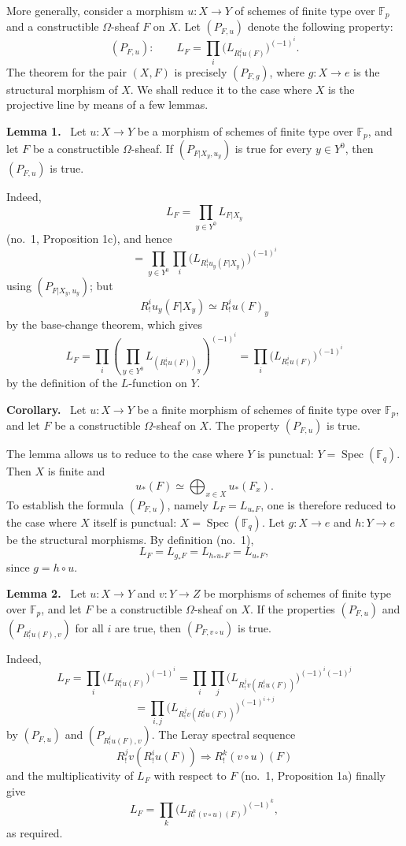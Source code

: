 \documentclass[11pt]{article}
\newenvironment{statement}[1]{\par\medskip\noindent\textbf{#1.}\ }{\par\medskip}
\DeclareMathOperator{\Spec}{Spec}
\providecommand{\Spec}{\operatorname{Spec}}
\providecommand{\Spec}{\operatorname{Spec}}
\providecommand{\Spec}{\operatorname{Spec}}
\providecommand{\Spec}{\operatorname{Spec}}
\begin{document}
More generally, consider a morphism $u:X\to Y$ of schemes of finite type over $\mathbb F_p$ and a constructible $\Omega$-sheaf $F$ on $X$. Let $(P_{F,u})$ denote the following property:
\[
(P_{F,u}):\qquad
L_F=\prod_i\bigl(L_{R^i_!u(F)}\bigr)^{(-1)^i}.
\]
The theorem for the pair $(X,F)$ is precisely $(P_{F,g})$, where $g:X\to e$ is the structural morphism of $X$. We shall reduce it to the case where $X$ is the projective line by means of a few lemmas.

\begin{statement}{Lemma 1}
Let $u:X\to Y$ be a morphism of schemes of finite type over $\mathbb F_p$, and let $F$ be a constructible $\Omega$-sheaf. If $(P_{F|X_y,u_y})$ is true for every $y\in Y^0$, then $(P_{F,u})$ is true.
\end{statement}

Indeed,
\[
L_F=\prod_{y\in Y^0}L_{F|X_y}
\]
(no.~1, Proposition 1c), and hence
\[
=\prod_{y\in Y^0}\prod_i\bigl(L_{R^i_!u_y(F|X_y)}\bigr)^{(-1)^i}
\]
using $(P_{F|X_y,u_y})$; but
\[
R^i_!u_y(F|X_y)\simeq R^i_!u(F)_y
\]
by the base-change theorem, which gives
\[
L_F=\prod_i\left(\prod_{y\in Y^0}L_{(R^i_!u(F))_y}\right)^{(-1)^i}
=\prod_i\bigl(L_{R^i_!u(F)}\bigr)^{(-1)^i}
\]
by the definition of the $L$-function on $Y$.

\begin{statement}{Corollary}
Let $u:X\to Y$ be a finite morphism of schemes of finite type over $\mathbb F_p$, and let $F$ be a constructible $\Omega$-sheaf on $X$. The property $(P_{F,u})$ is true.
\end{statement}

The lemma allows us to reduce to the case where $Y$ is punctual: $Y=\Spec(\mathbb F_q)$. Then $X$ is finite and
\[
u_*(F)\simeq \bigoplus_{x\in X}u_*(F_x).
\]
To establish the formula $(P_{F,u})$, namely $L_F=L_{u_*F}$, one is therefore reduced to the case where $X$ itself is punctual: $X=\Spec(\mathbb F_q)$. Let $g:X\to e$ and $h:Y\to e$ be the structural morphisms. By definition (no.~1),
\[
L_F=L_{g_*F}=L_{h_*u_*F}=L_{u_*F},
\]
since $g=h\circ u$.

\begin{statement}{Lemma 2}
Let $u:X\to Y$ and $v:Y\to Z$ be morphisms of schemes of finite type over $\mathbb F_p$, and let $F$ be a constructible $\Omega$-sheaf on $X$. If the properties $(P_{F,u})$ and $(P_{R^i_!u(F),v})$ for all $i$ are true, then $(P_{F,v\circ u})$ is true.
\end{statement}

Indeed,
\[
L_F=\prod_i\bigl(L_{R^i_!u(F)}\bigr)^{(-1)^i}
 =\prod_i\prod_j\bigl(L_{R^j_!v(R^i_!u(F))}\bigr)^{(-1)^i(-1)^j}
\]
\[
=\prod_{i,j}\bigl(L_{R^j_!v(R^i_!u(F))}\bigr)^{(-1)^{i+j}}
\]
by $(P_{F,u})$ and $(P_{R^i_!u(F),v})$. The Leray spectral sequence
\[
R^j_!v(R^i_!u(F))\Longrightarrow R^k_!(v\circ u)(F)
\]
and the multiplicativity of $L_F$ with respect to $F$ (no.~1, Proposition 1a) finally give
\[
L_F=\prod_k\bigl(L_{R^k_!(v\circ u)(F)}\bigr)^{(-1)^k},
\]
as required.
\end{document}
